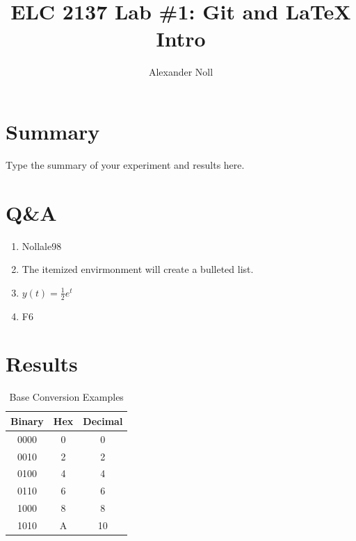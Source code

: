 \documentclass[11pt]{article}
\begin{document}
\title{ELC 2137 Lab \#1: Git and LaTeX Intro}
\author{Alexander Noll}

\maketitle


\section*{Summary}

Type the summary of your experiment and results here.  


\section*{Q\&A}

\begin{enumerate}
	\item Nollale98
	\item The itemized envirmonment will create a bulleted list.
	\item $ y(t) = \frac{1}{2} e^t$
	\item F6
\end{enumerate}


\section*{Results}

\begin{table}[ht]\centering\caption{Base Conversion Examples}\label{tbl:example_table}\begin{tabular}{c|c|c}\toprule Binary & Hex & Decimal \\\midrule0000 & 0 & 0 \\0010 & 2 & 2 \\0100 & 4 & 4 \\0110 & 6 & 6 \\1000 & 8 & 8 \\1010 & A & 10 \\\bottomrule\end{tabular} \end{table}
\end{document}
